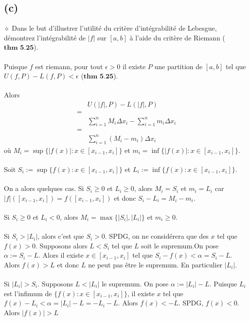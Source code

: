 \documentclass[a4paper,10pt]{article}
\begin{document}
\subsection*{(c)}
$\diamond$ Dans le but d'illustrer l'utilité du critère d'intégrabilité de Lebesgue, démontrez l'intégrabilité de 
$|f|$ sur $[a,b]$ à l'aide du critère de Riemann ($\textbf{thm 5.25}$).
\\
\\
Puisque $f$ est riemann, pour tout $\epsilon > 0$ il existe $P$ une partition
de $[a,b]$ tel que $U(f,P) - L(f,P) < \epsilon$ ($\textbf{thm 5.25}$).
\\
\\
Alors 
\begin{align*}
  & U(|f|,P) - L(|f|,P) \\
  = \\
  & \sum_{i = 1}^n M_i \Delta x_i - \sum_{i = 1}^n m_i \Delta x_i \\
  = \\
  & \sum_{i = 1}^n (M_i - m_i) \Delta x_i
\end{align*}
où $M_i = \sup\{|f(x)| : x \in [x_{i-1}, x_i]\}$ et $m_i = \inf\{|f(x)| : x \in [x_{i-1}, x_i]\}$.
\\
\\
Soit $S_i:=\sup\{f(x) : x \in [x_{i-1}, x_i]\}$ et $L_i := \inf\{f(x) : x \in [x_{i-1}, x_i]\}$.
\\
\\
On a alors quelques cas. Si $S_i \geq 0$ et $L_i \geq 0$, alors $M_i = S_i$ et $m_i = L_i$ car 
$|f|([x_{i-1}, x_i]) = f([x_{i-1},x_i])$ et donc $S_i - L_i = M_i - m_i$.
\\
\\
Si $S_i \geq 0$ et $L_i < 0$, alors $M_i = \max\{|S_i|, |L_i|\}$ et $m_i \geq 0$. 
\\
\\
Si $S_i > |L_i|$, alors c'est que $S_i > 0$. SPDG, on ne considérera que des $x$ tel que $f(x) > 0$. 
Supposons alors $L < S_i$ tel que $L$ soit le supremum.On pose $\alpha := S_i - L$. 
Alors il existe $x \in [x_{i-1}, x_i]$ tel que $S_i - f(x) < \alpha = S_i - L$.
Alors $f(x) > L$ et donc $L$ ne peut pas être le supremum. En particulier $|L_i|$.
\\
\\
Si $|L_i| > S_i$. Supposons $L < |L_i|$ le supremum. On pose $\alpha := |L_i| - L$. 
Puisque $L_i$ est l'infimum de $\{f(x) : x \in [x_{i-1}, x_i]\}$, il existe $x$ tel que 
$f(x) - L_i < \alpha = |L_i| - L = -L_i - L$. Alors $f(x) < -L$. SPDG, $f(x) < 0$. Alors $|f(x)| > L$
\end{document}
